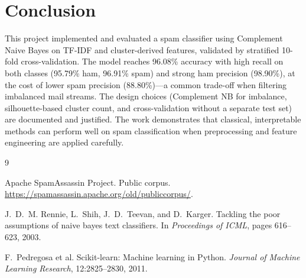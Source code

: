 \documentclass[11pt]{article}
\begin{document}
\section{Conclusion}

This project implemented and evaluated a spam classifier using Complement Naive Bayes on TF-IDF and cluster-derived features, validated by stratified 10-fold cross-validation. The model reaches 96.08\% accuracy with high recall on both classes (95.79\% ham, 96.91\% spam) and strong ham precision (98.90\%), at the cost of lower spam precision (88.80\%)---a common trade-off when filtering imbalanced mail streams. The design choices (Complement NB for imbalance, silhouette-based cluster count, and cross-validation without a separate test set) are documented and justified. The work demonstrates that classical, interpretable methods can perform well on spam classification when preprocessing and feature engineering are applied carefully.

\begin{thebibliography}{9}

Apache SpamAssassin Project.
\newblock Public corpus.
\newblock \url{https://spamassassin.apache.org/old/publiccorpus/}.

J.~D.~M. Rennie, L.~Shih, J.~D.~Teevan, and D.~Karger.
\newblock Tackling the poor assumptions of naive bayes text classifiers.
\newblock In \emph{Proceedings of ICML}, pages 616--623, 2003.

F.~Pedregosa et al.
\newblock Scikit-learn: Machine learning in Python.
\newblock \emph{Journal of Machine Learning Research}, 12:2825--2830, 2011.

\end{thebibliography}
\end{document}
